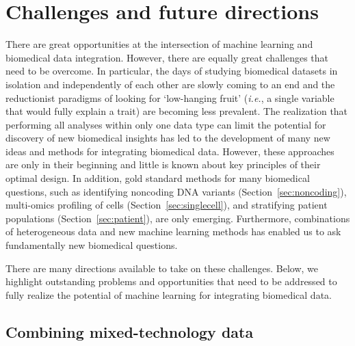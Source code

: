 \documentclass[5p]{elsarticle}
\newcommand{\ie}{\emph{i.e.}\xspace}
\newcommand{\rev}[1]{{\color{black}#1}}
\begin{document}
\section{Challenges and future directions}\label{sec:discussion}

There are great opportunities at the intersection of machine learning and biomedical data integration. However, there are equally great challenges that need to be overcome. In particular, the days of studying biomedical datasets in isolation and independently of each other are slowly coming to an end and the reductionist paradigms of looking for `low-hanging fruit' (\ie, \rev{a single variable that would fully explain a trait}) are becoming less prevalent. The realization that performing all analyses within only one data type \rev{can limit the potential for discovery} of new biomedical insights has led to the development of many new ideas and methods for integrating biomedical data. However, these approaches are only in their beginning and little is known about key principles of their optimal design. In addition, gold standard methods for many biomedical \rev{questions}, such as identifying noncoding DNA variants (Section~\ref{sec:noncoding}), multi-omics profiling of \rev{cells} (Section~\ref{sec:singlecell}), and stratifying patient populations (Section~\ref{sec:patient})\rev{,} are only emerging. Furthermore, \rev{combinations of heterogeneous data and new machine learning methods has enabled us} to ask fundamentally new biomedical questions.

There are many directions available to take on these challenges. Below, we highlight outstanding problems and opportunities that need to be addressed to fully realize the potential of machine learning for integrating biomedical data.

\subsection{Combining mixed-technology data}
\end{document}
